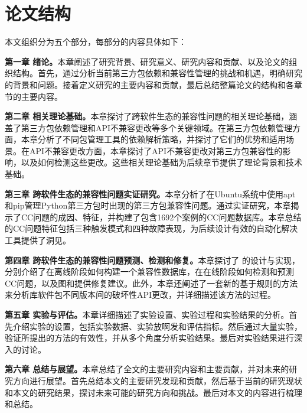 \section{论文结构}
本文组织分为五个部分，每部分的内容具体如下：

\textbf{第一章 绪论。}本章阐述了研究背景、研究意义、研究内容和贡献、以及论文的组织结构。首先，通过分析当前第三方包依赖和兼容性管理的挑战和机遇，明确研究的背景和问题。接着定义研究的主要内容和贡献，最后总结整篇论文的结构和各章节的主要内容。

\textbf{第二章 相关理论基础。}本章探讨了跨软件生态的兼容性问题的相关理论基础，涵盖了第三方包依赖管理和API不兼容更改等多个关键领域。在第三方包依赖管理方面，本章分析了不同包管理工具的依赖解析策略，并探讨了它们的优势和适用场景。在API不兼容更改方面，本章探讨了API不兼容更改对第三方包兼容性的影响，以及如何检测这些更改。这些相关理论基础为后续章节提供了理论背景和技术基础。

\textbf{第三章 跨软件生态的兼容性问题实证研究。}本章分析了在Ubuntu系统中使用apt和pip管理Python第三方包时出现的第三方包兼容性问题。通过实证研究，本章揭示了CC问题的成因、特征，并构建了包含1692个案例的CC问题数据库。本章总结的CC问题特征包括三种触发模式和四种故障表现，为后续设计有效的自动化解决工具提供了洞见。

\textbf{第四章 跨软件生态的兼容性问题预测、检测和修复。}本章探讨了 \tool{}的设计与实现，分别介绍了\tool{}在离线阶段如何构建一个兼容性数据库，在在线阶段如何检测和预测CC问题，以及图和提供修复建议。此外，本章还阐述了一套新的基于规则的方法来分析库软件包不同版本间的破坏性API更改，并详细描述该方法的过程。


\textbf{第五章 实验与评估。}本章详细描述了实验设置、实验过程和实验结果的分析。首先介绍实验的设置，包括实验数据、实验放啊发和评估指标。然后通过大量实验，验证所提出的方法的有效性，并从多个角度分析实验结果。最后对实验结果进行深入的讨论。

\textbf{第六章 总结与展望。}本章总结了全文的主要研究内容和主要贡献，并对未来的研究方向进行展望。首先总结本文的主要研究发现和贡献，然后基于当前的研究现状和本文的研究结果，探讨未来可能的研究方向和挑战。最后对本文的内容进行梳理和总结。


